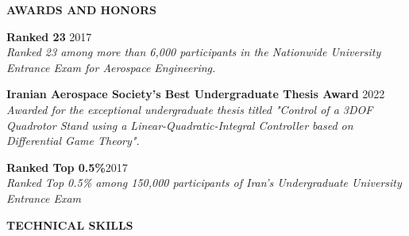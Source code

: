 \documentclass[12pt]{article}
\begin{document}
\vspace{0.2in} %


\begin{center}
	{\noindent \bfseries AWARDS AND HONORS}
\end{center}

 
\vspace{8pt} %


\noindent
{\bfseries Ranked 23} 
\hfill 2017 \vspace{4pt}\\
\textit{Ranked 23 among more than 6,000 participants in the Nationwide University Entrance Exam for Aerospace Engineering.}
\vspace{04pt}

\noindent
{\bfseries Iranian Aerospace Society's Best Undergraduate Thesis Award} 
\hfill 2022 \vspace{4pt} \\
\textit{Awarded for the exceptional
undergraduate thesis titled "Control of a 3DOF Quadrotor Stand using a Linear-Quadratic-Integral Controller 
based on Differential Game Theory".}

\vspace{02pt}
\noindent
{\bfseries Ranked Top 0.5\%}\hfill 2017 \vspace{4pt} \\ 
\textit{Ranked Top 0.5\% among 150,000 participants of Iran's Undergraduate University Entrance Exam}




\vspace{0.2in} %


\newpage
\begin{center}
	{\noindent \bfseries TECHNICAL SKILLS}
\end{center}

\end{document}
